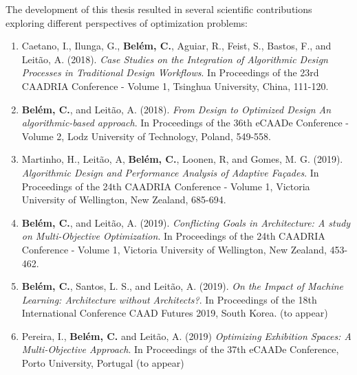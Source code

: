 The development of this thesis resulted in several scientific contributions exploring different perspectives of optimization problems:

\begin{enumerate}
\item Caetano, I., Ilunga, G., \textbf{Belém, C.}, Aguiar, R., Feist, S., Bastos, F., and Leitão, A. (2018). \textit{Case Studies on the Integration of Algorithmic Design Processes in Traditional Design Workflows}. In Proceedings of the 23rd CAADRIA Conference - Volume 1, Tsinghua University, China, 111-120.

\item \textbf{Belém, C.}, and Leitão, A. (2018). \textit{From Design to Optimized Design An algorithmic-based approach}. In Proceedings of the 36th eCAADe Conference - Volume 2, Lodz University of Technology, Poland, 549-558.

\item Martinho, H., Leitão, A, \textbf{Belém, C.}, Loonen, R, and Gomes, M. G. (2019). \textit{Algorithmic Design and Performance Analysis of Adaptive Façades}. In Proceedings of the 24th CAADRIA Conference - Volume 1, Victoria University of Wellington, New Zealand, 685-694.

\item \textbf{Belém, C.}, and Leitão, A. (2019). \textit{Conflicting Goals in Architecture: A study on Multi-Objective Optimization}. In Proceedings of the 24th CAADRIA Conference - Volume 1, Victoria University of Wellington, New Zealand, 453-462.

\item \textbf{Belém, C.}, Santos, L. S., and Leitão, A. (2019). \textit{On the Impact of Machine Learning: Architecture without Architects?}. In Proceedings of the 18th International Conference CAAD Futures 2019, South Korea. (to appear)

\item Pereira, I., \textbf{Belém, C.} and Leitão, A. (2019) \textit{Optimizing Exhibition Spaces: A Multi-Objective Approach}. In Proceedings of the 37th eCAADe Conference, Porto University, Portugal (to appear)

\end{enumerate}



